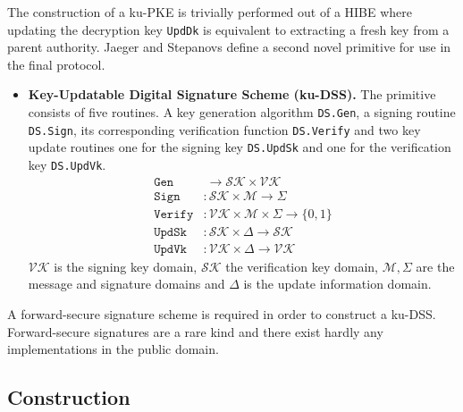 \documentclass[11pt,a4paper,twoside,openright,bibliography=totoc]{scrbook}
\begin{document}
The construction of a ku-PKE is trivially performed out of a HIBE where updating
the decryption key \texttt{UpdDk} is equivalent to extracting a fresh key from
a parent authority. Jaeger and Stepanovs define a second novel primitive for use
in the final protocol.
\begin{itemize}
\item \textbf{Key-Updatable Digital Signature Scheme (ku-DSS).} The primitive
  consists of five routines. A key generation algorithm
  \texttt{DS.Gen}, a signing routine \texttt{DS.Sign}, its corresponding
  verification function \texttt{DS.Verify} and two key update routines
  one for the signing key \texttt{DS.UpdSk} and one for the verification
  key \texttt{DS.UpdVk}.
  \begin{align*}
    \texttt{Gen} & \  \rightarrow \mathcal{SK} \times \mathcal{VK} \\
    \texttt{Sign} & : \mathcal{SK} \times \mathcal{M} \rightarrow \Sigma \\
    \texttt{Verify} & : \mathcal{VK} \times \mathcal{M} \times \Sigma \rightarrow \{0,1\} \\
    \texttt{UpdSk} & : \mathcal{SK} \times \Delta \rightarrow \mathcal{SK} \\
    \texttt{UpdVk} & : \mathcal{VK} \times \Delta \rightarrow \mathcal{VK}
  \end{align*}
  $\mathcal{VK}$ is the signing key domain, $\mathcal{SK}$ the verification key
  domain, $\mathcal{M}, \Sigma$ are the message and signature domains and
  $\Delta$ is the update information domain.
\end{itemize}

A forward-secure signature scheme is required in order to construct a ku-DSS.
Forward-secure signatures are a rare kind and there exist hardly any
implementations in the public domain.

\subsection{Construction}
\label{sec:construction-1}
\end{document}
